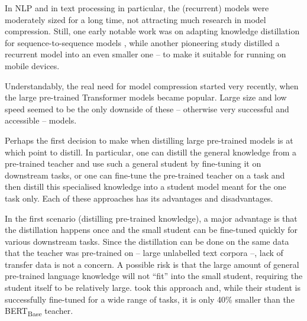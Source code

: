 \documentclass[bsc,frontabs,twoside,singlespacing,parskip,deptreport]{infthesis}
\begin{document}
{{{      %
      In NLP and in text processing in particular, the (recurrent) models were moderately sized for a long time, not attracting much research in model compression. Still, one early notable work was on adapting knowledge distillation for sequence-to-sequence models \citep{Kim_2016}, while another pioneering study \citep{Yu_2018} distilled a recurrent model into an even smaller one -- to make it suitable for running on mobile devices.

      Understandably, the real need for model compression started very recently, when the large pre-trained Transformer models became popular. Large size and low speed seemed to be the only downside of these -- otherwise very successful and accessible -- models.

      Perhaps the first decision to make when distilling large pre-trained models is at which point to distill. In particular, one can distill the general knowledge from a pre-trained teacher and use such a general student by fine-tuning it on downstream tasks, or one can fine-tune the pre-trained teacher on a task and then distill this specialised knowledge into a student model meant for the one task only. Each of these approaches has its advantages and disadvantages.

      In the first scenario (distilling pre-trained knowledge), a major advantage is that the distillation happens once and the small student can be fine-tuned quickly for various downstream tasks.
      Since the distillation can be done on the same data that the teacher was pre-trained on -- large unlabelled text corpora --, lack of transfer data is not a concern.
      A possible risk is that the large amount of general pre-trained language knowledge will not ``fit'' into the small student, requiring the student itself to be relatively large. \citet{Sanh_2019} took this approach and, while their student is successfully fine-tuned for a wide range of tasks, it is only 40\% smaller than the BERT\textsubscript{Base} teacher.

}}}
\end{document}
